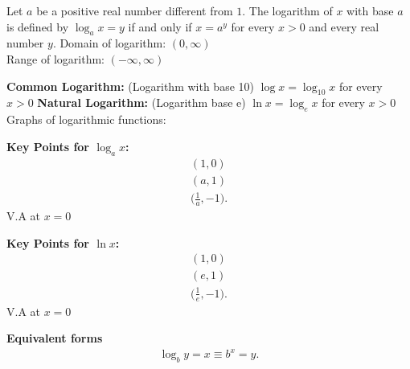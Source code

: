 \documentclass{report}
\begin{document}
      \bigbreak \noindent 
        \smallbreak \noindent
        \begin{definition}
                Let $a$ be a positive real number different from $1$. The logarithm of $x$ with base $a$ is defined by $\log_a x = y$ if and only if $x = a^y$ for every $x > 0$ and every real number $y$.
      \bigbreak \noindent 
      Domain of logarithm: $(0, \infty)$ \\
      Range of logarithm: $(-\infty, \infty)$
        \end{definition}

      \bigbreak \noindent 
      \textbf{Common Logarithm:} (Logarithm with base 10) $\log x = \log_{10} x$ for every $x > 0$
      \bigbreak \noindent 
      \textbf{Natural Logarithm:} (Logarithm base e) $\ln x = \log_e x$ for every $x > 0$
      \bigbreak \noindent 
      Graphs of logarithmic functions:
      \begin{figure}[ht]
          \centering
          \label{fig:loga}
      \end{figure}
      \bigbreak \noindent 
      \begin{mdframed}
        \textbf{Key Points for $\log_{a}{x}$:}
        \bigbreak \noindent 
        \begin{align*}
          (1,0) \\
          (a,1) \\
          \bigg(\frac{1}{a}, -1\bigg)
        .\end{align*}
        \bigbreak \noindent 
        V.A at $x=0 $
      \end{mdframed}

      \bigbreak \noindent 
        \begin{mdframed}
        \textbf{Key Points for $\ln{x}$:}
        \bigbreak \noindent 
        \begin{align*}
          (1,0) \\
          (e,1) \\
          \bigg(\frac{1}{e}, -1\bigg)
        .\end{align*}
        \bigbreak \noindent 
        V.A at $x=0 $
      \end{mdframed}

      \bigbreak \noindent 
      \begin{mdframed}
        \textbf{Equivalent forms}
        \begin{align*}
          \log_{b}{y} = x \equiv b^{x} = y
        .\end{align*}
      \end{mdframed}
\end{document}
